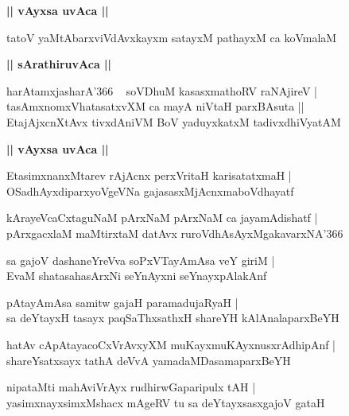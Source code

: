 \documentclass[twoside,12pt,openright]{book}
\newcounter{shloka}[chapter]
\def\uvaca#1{\centerline{{\large\textbf{#1}}}}
\begin{document}
\uvaca{|| vAyxsa uvAca ||}

\begin{shloka}%
tatoV yaMtAbarxviVdAvxkayxm satayxM pathayxM ca koVmalaM
\end{shloka}

\uvaca{|| sArathiruvAca ||}

\begin{shloka}%
harAtamxjasharA\char'366 ~ soVDhuM kasasxmathoRV raNAjireV |\\
tasAmxnomxVhatasatxvXM ca mayA niVtaH parxBAsuta ||\\
EtajAjxcnXtAvx tivxdAniVM BoV yaduyxkatxM tadivxdhiVyatAM
\end{shloka}

\uvaca{|| vAyxsa uvAca ||}

\begin{shloka}%
EtasimxnanxMtarev rAjAcnx perxVritaH karisatatxmaH |\\
OSadhAyxdiparxyoVgeVNa gajasasxMjAcnxmaboVdhayatf 
\end{shloka}

\begin{shloka}%
kArayeVcaCxtaguNaM pArxNaM pArxNaM ca jayamAdishatf |\\
pArxgacxlaM maMtirxtaM datAvx ruroVdhAsAyxMgakavarxNA\char'366
\end{shloka}

\begin{shloka}%
sa gajoV dashaneYreVva soPxVTayAmAsa veY giriM |\\
EvaM shatasahasArxNi seYnAyxni seYnayxpAlakAnf 
\end{shloka}

\begin{shloka}%
pAtayAmAsa samitw gajaH paramadujaRyaH |\\
sa deYtayxH tasayx paqSaThxsathxH shareYH kAlAnalaparxBeYH
\end{shloka}

\begin{shloka}%
hatAv cApAtayacoCxVrAvxyXM muKayxmuKAyxnusxrAdhipAnf |\\
shareYsatxsayx tathA deVvA yamadaMDasamaparxBeYH
\end{shloka}

\begin{shloka}%
nipataMti mahAviVrAyx rudhirwGaparipulx tAH |\\
yasimxnayxsimxMshacx mAgeRV tu sa deYtayxsasxgajoV gataH 
\end{shloka}
\end{document}
